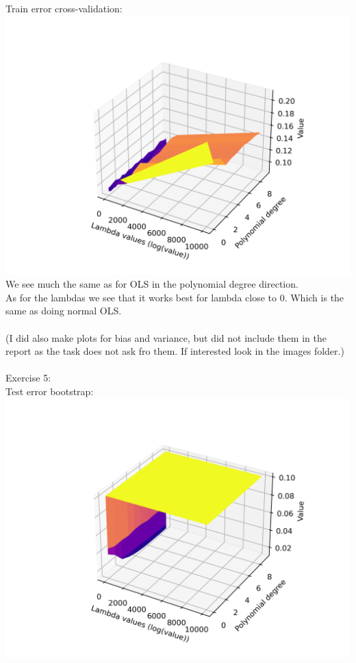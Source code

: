 \documentclass[12pt, letterpaper, twoside]{article}
\begin{document}
Train error cross-validation:\\
\includegraphics[scale=0.6]{"ex4_traningerror_cv.png"}\\
We see much the same as for OLS in the polynomial degree direction.\\
As for the lambdas we see that it works best for lambda close to 0. Which is the same as doing normal OLS.\\
\ \\
(I did also make plots for bias and variance, but did not include them in the report as the task does not ask fro them. If interested look in the images folder.)
\newpage
\ \\
Exercise 5:\\
Test error bootstrap:\\
\includegraphics[scale=0.6]{"ex5_testerror_bootstrap.png"}\\
\end{document}

